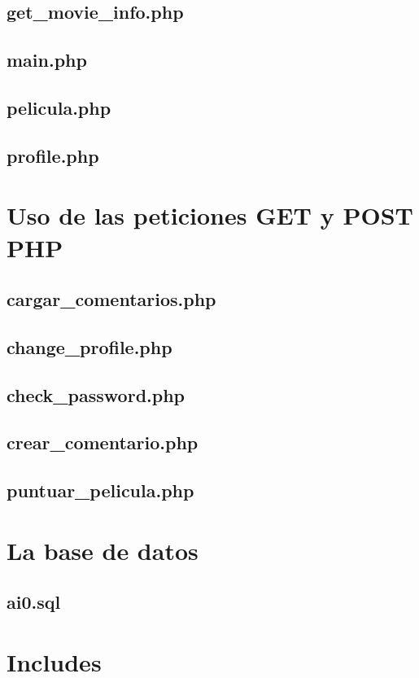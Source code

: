 \documentclass[a4paper, 12pt]{report}
\begin{document}
    \section{get\_movie\_info.php}
    \section{main.php}
    \section{pelicula.php}
    \section{profile.php}

    \chapter{Uso de las peticiones GET y POST PHP}
    \section{cargar\_comentarios.php}
    \section{change\_profile.php}
    \section{check\_password.php}
    \section{crear\_comentario.php}
    \section{puntuar\_pelicula.php}


    \chapter{La base de datos}
    \section{ai0.sql}



    \chapter{Includes}
\end{document}
